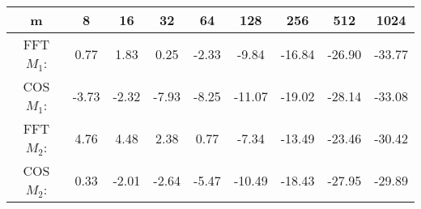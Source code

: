 \begin{minipage}{\textwidth}
\begin{center}
\begin{framed}
\begin{tabular}{c|c|c|c|c|c|c|c|c}
m & 8 & 16 & 32 & 64 & 128 & 256 & 512 & 1024 \\
\hline
FFT \(M_1\): &0.77 &   1.83 &  0.25 & -2.33&  -9.84 & -16.84 & -26.90 & -33.77\\
COS \(M_1\): & -3.73 &-2.32 &-7.93&  -8.25 & -11.07 & -19.02 & -28.14 &-33.08\\
FFT \(M_2\): &4.76  & 4.48 & 2.38&   0.77 &  -7.34 & -13.49& -23.46& -30.42\\
COS \(M_2\): & 0.33&  -2.01 & -2.64 &  -5.47 & -10.49 & -18.43 & -27.95 &-29.89\\
\end{tabular} 
 \label{table1}
\end{framed}
\end{center}
\end{minipage}